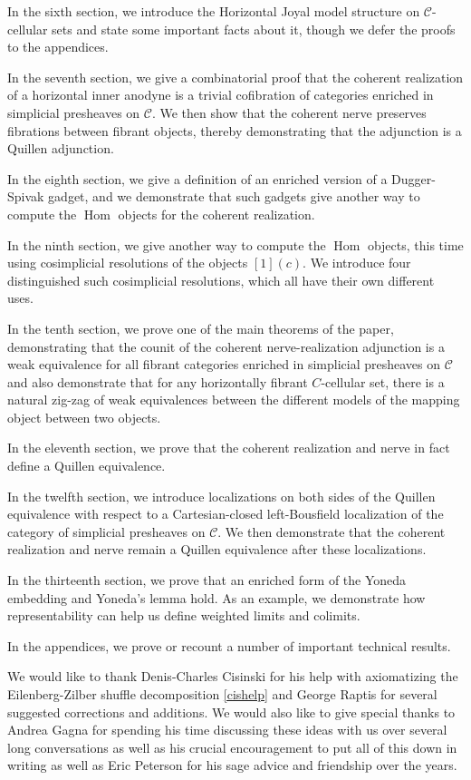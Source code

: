 \documentclass{amsart}
\numberwithin{equation}{section}
\theoremstyle{plain}   %
\theoremstyle{remark}
\theoremstyle{plain}
\DeclareMathOperator{\Hom}{Hom}
\newcommand{\C}{\ensuremath{\mathcal{C}}}
\begin{document}
In the sixth section, we introduce the Horizontal Joyal model structure on \(\C\)-cellular sets and state some important facts about it, though we defer the proofs to the appendices.

In the seventh section, we give a combinatorial proof that the coherent realization of a horizontal inner anodyne is a trivial cofibration of categories enriched in simplicial presheaves on \(\C\).  We then show that the coherent nerve preserves fibrations between fibrant objects, thereby demonstrating that the adjunction is a Quillen adjunction.

In the eighth section, we give a definition of an enriched version of a Dugger-Spivak gadget, and we demonstrate that such gadgets give another way to compute the \(\Hom\) objects for the coherent realization.  

In the ninth section, we give another way to compute the \(\Hom\) objects, this time using cosimplicial resolutions of the objects \([1](c)\).  We introduce four distinguished such cosimplicial resolutions, which all have their own different uses.

In the tenth section, we prove one of the main theorems of the paper, demonstrating that the counit of the coherent nerve-realization adjunction is a weak equivalence for all fibrant categories enriched in simplicial presheaves on \(\C\) and also demonstrate that for any horizontally fibrant \(C\)-cellular set, there is a natural zig-zag of weak equivalences between the different models of the mapping object between two objects. 

In the eleventh section, we prove that the coherent realization and nerve in fact define a Quillen equivalence.  

In the twelfth section, we introduce localizations on both sides of the Quillen equivalence with respect to a Cartesian-closed left-Bousfield localization of the category of simplicial presheaves on \(\C\).  We then demonstrate that the coherent realization and nerve remain a Quillen equivalence after these localizations. 

In the thirteenth section, we prove that an enriched form of the Yoneda embedding and Yoneda's lemma hold. As an example, we demonstrate how representability can help us define weighted limits and colimits.

In the appendices, we prove or recount a number of important technical results.  

We would like to thank Denis-Charles Cisinski for his help with axiomatizing the Eilenberg-Zilber shuffle decomposition \ref{cishelp} and George Raptis for several suggested corrections and additions.  We would also like to give special thanks to Andrea Gagna for spending his time discussing these ideas with us over several long conversations as well as his crucial encouragement to put all of this down in writing as well as Eric Peterson for his sage advice and friendship over the years.
\end{document}
